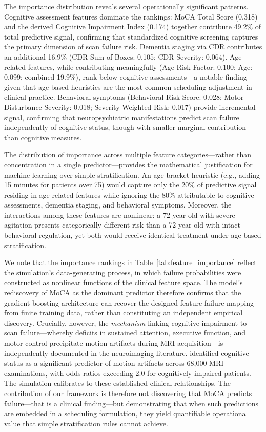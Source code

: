\documentclass[11pt,a4paper]{article}
\begin{document}
The importance distribution reveals several operationally significant patterns. Cognitive assessment features dominate the rankings: MoCA Total Score (0.318) and the derived Cognitive Impairment Index (0.174) together contribute 49.2\% of total predictive signal, confirming that standardized cognitive screening captures the primary dimension of scan failure risk. Dementia staging via CDR contributes an additional 16.9\% (CDR Sum of Boxes: 0.105; CDR Severity: 0.064). Age-related features, while contributing meaningfully (Age Risk Factor: 0.100; Age: 0.099; combined 19.9\%), rank below cognitive assessments---a notable finding given that age-based heuristics are the most common scheduling adjustment in clinical practice. Behavioral symptoms (Behavioral Risk Score: 0.028; Motor Disturbance Severity: 0.018; Severity-Weighted Risk: 0.017) provide incremental signal, confirming that neuropsychiatric manifestations predict scan failure independently of cognitive status, though with smaller marginal contribution than cognitive measures.

The distribution of importance across multiple feature categories---rather than concentration in a single predictor---provides the mathematical justification for machine learning over simple stratification. An age-bracket heuristic (e.g., adding 15 minutes for patients over 75) would capture only the 20\% of predictive signal residing in age-related features while ignoring the 80\% attributable to cognitive assessments, dementia staging, and behavioral symptoms. Moreover, the interactions among these features are nonlinear: a 72-year-old with severe agitation presents categorically different risk than a 72-year-old with intact behavioral regulation, yet both would receive identical treatment under age-based stratification.

We note that the importance rankings in Table~\ref{tab:feature_importance} reflect the simulation's data-generating process, in which failure probabilities were constructed as nonlinear functions of the clinical feature space. The model's rediscovery of MoCA as the dominant predictor therefore confirms that the gradient boosting architecture can recover the designed feature-failure mapping from finite training data, rather than constituting an independent empirical discovery. Crucially, however, the \textit{mechanism} linking cognitive impairment to scan failure---whereby deficits in sustained attention, executive function, and motor control precipitate motion artifacts during MRI acquisition---is independently documented in the neuroimaging literature. \citet{porembka2025disparities} identified cognitive status as a significant predictor of motion artifacts across 68,000 MRI examinations, with odds ratios exceeding 2.0 for cognitively impaired patients. The simulation calibrates to these established clinical relationships. The contribution of our framework is therefore not discovering that MoCA predicts failure---that is a clinical finding---but demonstrating that when such predictions are embedded in a scheduling formulation, they yield quantifiable operational value that simple stratification rules cannot achieve.
\end{document}

